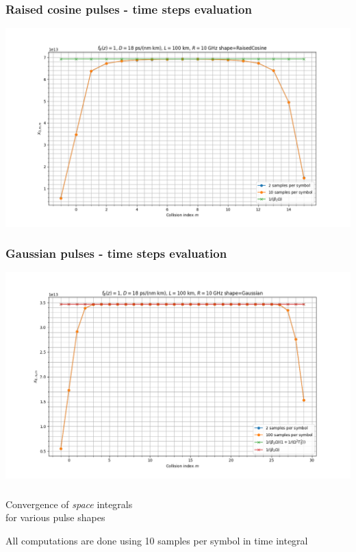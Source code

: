 \documentclass[8pt]{beamer} %
\begin{document}
\begin{frame}
	\frametitle{Raised cosine pulses - time steps evaluation}
	\includegraphics[width=\textwidth]{"./images/sim/Raised_time.png"}
\end{frame}

\begin{frame}
  \frametitle{Gaussian pulses - time steps evaluation}
  \includegraphics[width=\textwidth]{"./images/sim/very much.png"}
\end{frame}

\begin{frame}
	\frametitle{}
	\huge{Convergence of \textit{space} integrals \\for various pulse shapes}
	
		\vspace{30pt}
	\normalsize{All computations are done using 10 samples per symbol in time integral}
\end{frame}
\end{document}
